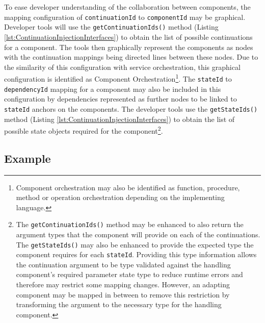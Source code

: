 \documentclass[prodmode]{style/acmlarge}
\begin{document}
To ease developer understanding of the collaboration between components, the
mapping configuration of \texttt{continuationId}  to \texttt{componentId} may be
graphical.  Developer tools will use the \texttt{getContinuationIds()} method
(Listing \ref{lst:ContinuationInjectionInterfaces}) to obtain the list of possible
continuations for a component.  The tools then graphically represent the
components as nodes with the continuation mappings being directed lines between
these nodes.  Due to the similarity of this configuration with service
orchestration, this graphical configuration is identified as Component
Orchestration\footnote{Component orchestration may also be identified as
function, procedure, method or operation orchestration depending on the
implementing language.}.  The \texttt{stateId} to \texttt{dependencyId} mapping
for a component may also be included in this configuration by dependencies
represented as further nodes to be linked to \texttt{stateId} anchors on the
components.  The developer tools use the \texttt{getStateIds()} method (Listing
\ref{lst:ContinuationInjectionInterfaces}) to obtain the list of possible state
objects required for the component\footnote{The \texttt{getContinuationIds()}
method may be enhanced to also return the argument types that the component will
provide on each of the continuations.  The \texttt{getStateIds()} may also be
enhanced to provide the expected type the component requires for each
\texttt{stateId}.  Providing this type information allows the continuation
argument to be type validated against the handling component's required
parameter state type to reduce runtime errors and therefore may restrict some
mapping changes.  However, an adapting component may be mapped in between to
remove this restriction by transforming the argument to the necessary type for
the handling component.}.


\subsection{Example}
\end{document}
